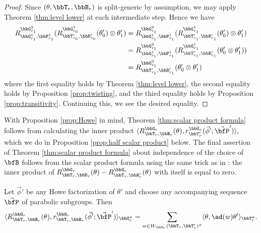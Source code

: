 \begin{proof}
  Since $(\theta,\bbT_r,\bbB_r)$ is split-generic by assumption, we may apply Theorem \ref{thm:level lower} at each intermediate step. Hence we have
  \begin{align*}
    R_{\bbG_{r_1}^{1}, \bbP_{r_1}^{1}}^{\bbG_{r_1}^{2}}(R_{\bbT_{r_0}', \bbB_{r_0}'}^{\bbG_{r_0}^{1}}(\theta_0') \otimes \theta_1') 
    &= R_{\bbG_{r_1}^{1}, \bbP_{r_1}^{1}}^{\bbG_{r_1}^{2}}(R_{\bbT_{r_1}', \bbB_{r_1}'}^{\bbG_{r_1}^{1}}(\theta_0') \otimes \theta_1')\\
    &= R_{\bbG_{r_1}^{1}, \bbP_{r_1}^{1}}^{\bbG_{r_1}^{2}}(R_{\bbT_{r_1}', \bbB_{r_1}'}^{\bbG_{r_1}^{1}}(\theta_0' \otimes \theta_1')) \\
    &= R_{\bbT_{r_1}', \bbB_{r_1}'}^{\bbG_{r_1}^{2}}(\theta_0' \otimes \theta_1')
  \end{align*}
  where the first equality holds by Theorem \ref{thm:level lower}, the second equality holds by Proposition \ref{prop:twisting}, and the third equality holds by Proposition \ref{prop:transitivity}. Continuing this, we see the desired equality.
\end{proof}

With Proposition \ref{prop:Howe} in mind, Theorem \ref{thm:scalar product formula} follows from calculating the inner product $\langle R_{\bbT_r,\bbB_r}^{\bbG_r}(\theta), r_{\bbT_r'}^{\bbG_r}(\vec \phi'; \vec \bfP') \rangle,$ which we do in Proposition \ref{prop:half scalar product} below. The final assertion of Theorem \ref{thm:scalar product formula} about independence of the choice of $\bfB$ follows from the scalar product formula using the same trick as in \cite[Corollary 2.4]{Lus04}: the inner product of $R_{\bbT_r,\bbB_r}^{\bbG_r}(\theta) - R_{\bbT_r,\bbB_r'}^{\bbG_r}(\theta)$ with itself is equal to zero.

\begin{proposition}\label{prop:half scalar product}
  Let $\vec \phi'$ be any Howe factorization of $\theta'$ and choose any accompanying sequence $\vec \bfP$ of parabolic subgroups. Then 
  \begin{equation*}
    \langle R_{\bbT_r,\bbB_r}^{\bbG_r}(\theta), r_{\bbT_r,\bbB_r}^{\bbG_r}(\vec \phi'; \vec \bfP') \rangle_{\bbG_r^\sigma} = \sum_{w \in W_{\bbG_r}(\bbT_r,\bbT_r')^\sigma} \langle \theta, \ad(w) \theta' \rangle_{\bbT_r^\sigma}.
  \end{equation*}
\end{proposition}

